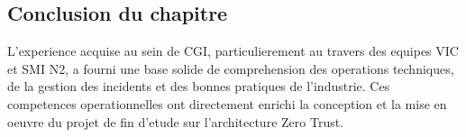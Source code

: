 \subsection{Conclusion du chapitre}
L'experience acquise au sein de CGI, particulierement au travers des equipes VIC et SMI N2, a fourni une base solide de comprehension des operations techniques, de la gestion des incidents et des bonnes pratiques de l'industrie. Ces competences operationnelles ont directement enrichi la conception et la mise en oeuvre du projet de fin d'etude sur l'architecture Zero Trust.